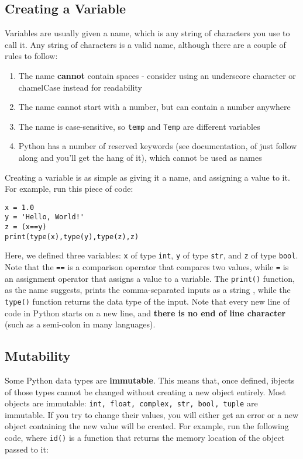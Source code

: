 \documentclass[12pt]{article}
\newcommand{\code}{\texttt}
\begin{document}
\subsection{Creating a Variable}
Variables are usually given a name, which is any string of characters you use to call it. Any string of characters is a valid name, although there are a couple of rules to follow:

\begin{enumerate}
	\item The name \textbf{cannot} contain spaces - consider using an underscore character or chamelCase instead for readability
	\item The name cannot start with a number, but can contain a number anywhere
	\item The name is case-sensitive, so \code{temp} and \code{Temp} are different variables
	\item Python has a number of reserved keywords (see documentation, of just follow along and you'll get the hang of it), which cannot be used as names
\end{enumerate}

Creating a variable is as simple as giving it a name, and assigning a value to it. For example, run this piece of code:

\begin{lstlisting}[frame=single] 
x = 1.0
y = 'Hello, World!'
z = (x==y)
print(type(x),type(y),type(z),z)
\end{lstlisting}

Here, we defined three variables: \code{x} of type \code{int}, \code{y} of type \code{str}, and \code{z} of type \code{bool}. Note that the \code{==} is a comparison operator that compares two values, while \code{=} is an assignment operator that assigns a value to a variable. The \code{print()} function, as the name suggests, prints the comma-separated inputs as a string , while the \code{type()} function returns the data type of the input. Note that every new line of code in Python starts on a new line, and \textbf{there is no end of line character} (such as a semi-colon in many languages).

\subsection{Mutability}

Some Python data types are \textbf{immutable}. This means that, once defined, ibjects of those types cannot be changed without creating a new object entirely. Most objects are immutable: \code{int, float, complex, str, bool, tuple} are immutable. If you try to change their values, you will either get an error or a new object containing the new value will be created. For example, run the following code, where \code{id()} is a function that returns the memory location of the object passed to it:
\end{document}
